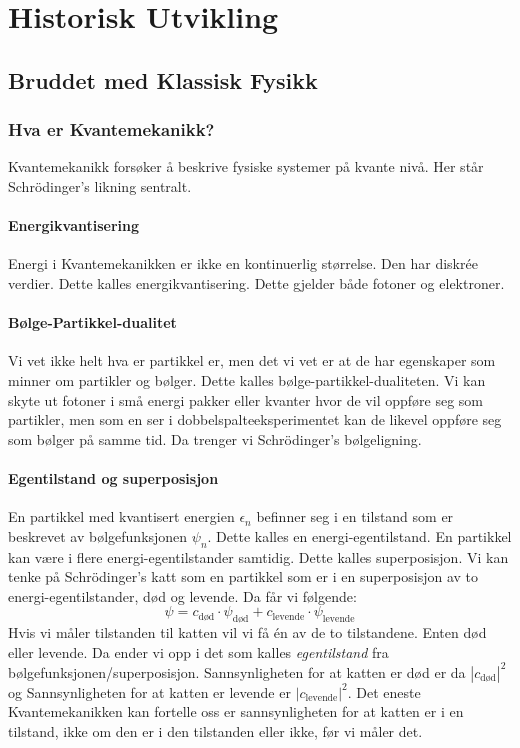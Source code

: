 \part{Historisk Utvikling}
\chapter{Bruddet med Klassisk Fysikk}
\section{Hva er Kvantemekanikk?} 
Kvantemekanikk forsøker å beskrive fysiske systemer på kvante nivå. Her står Schrödinger's likning sentralt. 

\subsection{Energikvantisering}
Energi i Kvantemekanikken er ikke en kontinuerlig størrelse. Den har diskrée verdier. Dette kalles energikvantisering. Dette gjelder både fotoner og elektroner. 

\subsection{Bølge-Partikkel-dualitet}
Vi vet ikke helt hva er partikkel er, men det vi vet er at de har egenskaper som minner om partikler og bølger. Dette kalles bølge-partikkel-dualiteten. Vi kan skyte ut fotoner i små energi pakker eller kvanter hvor de vil oppføre seg som partikler, men som en ser i dobbelspalteeksperimentet kan de likevel oppføre seg som bølger på samme tid. Da trenger vi Schrödinger's bølgeligning.

\subsection{Egentilstand og superposisjon}
En partikkel med kvantisert energien $ ϵ_{n} $ befinner seg i en tilstand som er beskrevet av bølgefunksjonen $ ψ_{n} $. Dette kalles en energi-egentilstand. En partikkel kan være i flere energi-egentilstander samtidig. Dette kalles superposisjon. Vi kan tenke på Schrödinger's katt som en partikkel som er i en superposisjon av to energi-egentilstander, død og levende. Da får vi følgende:
\[
ψ = c_{\text{død}} ⋅ ψ_{\text{død}} + c_{\text{levende}} ⋅ ψ_{\text{levende}}
\]
Hvis vi måler tilstanden til katten vil vi få én av de to tilstandene. Enten død eller levende. Da ender vi opp i det som kalles \textit{egentilstand} fra bølgefunksjonen/superposisjon. Sannsynligheten for at katten er død er da $ \left\vert c_{\text{død}} \right\vert ^{2} $ og Sannsynligheten for at katten er levende er $ \left\vert c_{\text{levende}} \right\vert ^{2} $. Det eneste Kvantemekanikken kan fortelle oss er sannsynligheten for at katten er i en tilstand, ikke om den er i den tilstanden eller ikke, før vi måler det. 

